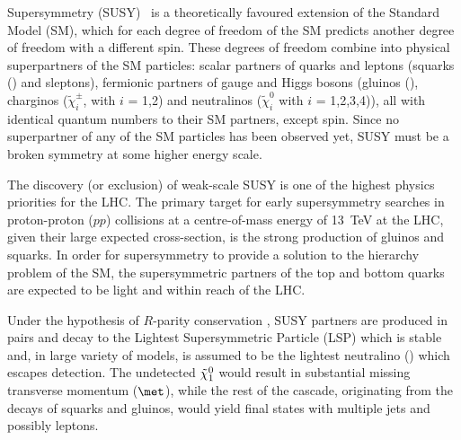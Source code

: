 
Supersymmetry (SUSY)~\cite{Miyazawa:1966,Ramond:1971gb,Golfand:1971iw,Neveu:1971rx,Neveu:1971iv,Gervais:1971ji,Volkov:1973ix,Wess:1973kz,Wess:1974tw}
is a theoretically favoured extension of the Standard Model (SM),
which for each degree of freedom of the SM predicts another degree of
freedom with a different spin. These degrees of freedom combine into
physical superpartners of the SM particles: scalar partners of quarks
and leptons (squarks (\sq) and sleptons), fermionic
partners of gauge and Higgs bosons (gluinos (\gl), charginos
($\tilde{\chi}^{\pm}_{i}$, with $i$ = 1,2) and neutralinos
($\tilde{\chi}^{0}_{i}$ with $i$ = 1,2,3,4)), all with identical quantum numbers to their SM partners, except spin.
Since no superpartner of any of the SM particles has been observed yet,
SUSY must be a broken symmetry at some higher energy scale.

The discovery (or exclusion) of weak-scale SUSY is one of the highest
physics priorities for the LHC. The primary target for early
supersymmetry searches in proton-proton ($pp$) collisions at
a centre-of-mass energy of 13~TeV at the LHC, given their large
expected cross-section, is the strong production of gluinos and squarks.
In order for supersymmetry to provide a solution to the hierarchy problem of the SM, the supersymmetric partners of the top and bottom quarks are 
expected to be light and within reach of the LHC. 

Under the hypothesis of $R$-parity conservation
\cite{Fayet:1976et,Fayet:1977yc,Farrar:1978xj,Fayet:1979sa}, SUSY
partners are produced in pairs and decay to the Lightest
Supersymmetric Particle (LSP) which is stable and, in large variety of
models, is assumed to be the lightest neutralino (\neut) which escapes detection.
The undetected $\tilde{\chi}_{1}^{0}$ would result in substantial missing
transverse momentum ($\met$), while the rest of the cascade, originating from the decays of
squarks and gluinos, would yield final states with multiple jets and
possibly leptons.

